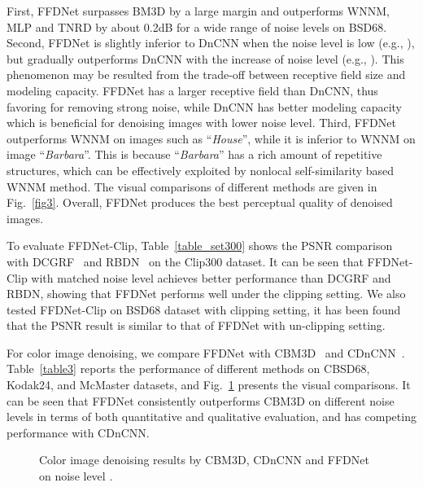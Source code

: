 \documentclass[journal]{IEEEtran}
\begin{document}
First, FFDNet surpasses BM3D by a large margin and outperforms WNNM, MLP and TNRD by about 0.2dB for a wide range of noise levels on BSD68. Second, FFDNet is slightly inferior to DnCNN when the noise level is low (e.g., ), but gradually outperforms DnCNN with the increase of noise level (e.g., ).
This phenomenon may be resulted from the trade-off between receptive field size and modeling capacity. FFDNet has a larger receptive field than DnCNN, thus favoring for removing strong noise, while DnCNN has better modeling capacity which is beneficial for denoising images with lower noise level. Third, FFDNet outperforms WNNM on images such as ``\emph{House}'', while it is inferior to WNNM on image ``\emph{Barbara}''.
This is because ``\emph{Barbara}'' has a rich amount of repetitive structures, which can be effectively exploited by nonlocal self-similarity based WNNM method. The visual comparisons of different methods are given in Fig.~\ref{fig3}.
Overall, FFDNet produces the best perceptual quality of denoised images.





To evaluate FFDNet-Clip, Table~\ref{table_set300} shows the PSNR comparison with DCGRF~\cite{Vemulapalli_2016_CVPR} and RBDN~\cite{santhanam2016generalized} on the Clip300 dataset.
It can be seen that FFDNet-Clip with matched noise level achieves better performance than DCGRF and RBDN, showing that FFDNet performs well under the clipping setting.
We also tested FFDNet-Clip on BSD68 dataset with clipping setting, it has been found that the PSNR result is similar to that of FFDNet with un-clipping setting.



For color image denoising, we compare FFDNet with CBM3D~\cite{dabov2007image} and CDnCNN~\cite{zhang2017beyond}.
Table~\ref{table3} reports the performance of different methods on CBSD68, Kodak24, and McMaster datasets, and
Fig.~\ref{fig5} presents the visual comparisons. It can be seen that FFDNet consistently outperforms CBM3D on different noise levels in terms of both quantitative and qualitative evaluation, and has competing performance with CDnCNN.




\begin{figure}[!tb]
\begin{center}

\caption{Color image denoising results by CBM3D, CDnCNN and FFDNet on noise level .}\label{fig5}
\end{center}\end{figure}
\end{document}
